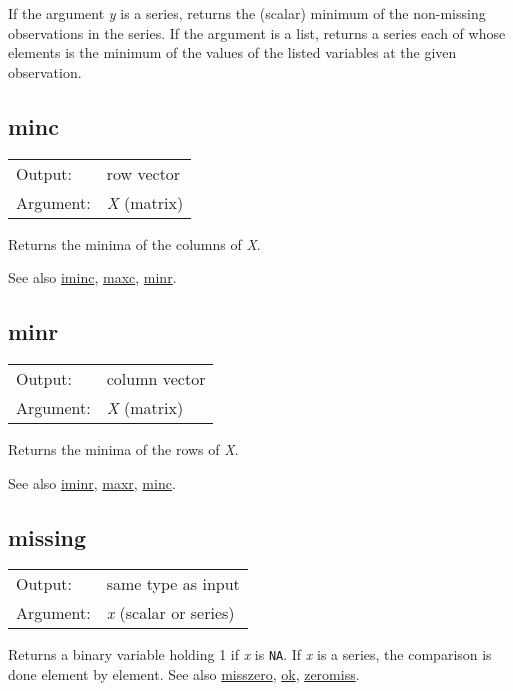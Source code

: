 	  If the argument \textsl{y} is a series, returns the
	  (scalar) minimum of the non-missing observations in the series.
	  If the argument is a list, returns a series each of whose
	  elements is the minimum of the values of the listed variables at
	  the given observation.

\subsection{minc}
\hypertarget{func-minc}{}

\begin{tabular}{ll}
Output:     & row vector\\
Argument:   & \textsl{X} (matrix)\\
\end{tabular}

	  Returns the minima of the columns of \textsl{X}.

	  See also \hyperlink{func-iminc}{iminc}, \hyperlink{func-maxc}{maxc}, \hyperlink{func-minr}{minr}.

\subsection{minr}
\hypertarget{func-minr}{}

\begin{tabular}{ll}
Output:     & column vector\\
Argument:   & \textsl{X} (matrix)\\
\end{tabular}

	  Returns the minima of the rows of \textsl{X}. 

	  See also \hyperlink{func-iminr}{iminr}, \hyperlink{func-maxr}{maxr}, \hyperlink{func-minc}{minc}.

\subsection{missing}
\hypertarget{func-missing}{}

\begin{tabular}{ll}
Output:     & same type as input\\
Argument:   & \textsl{x} (scalar or series)\\
\end{tabular}

	  Returns a binary variable holding 1 if \textsl{x} is
	  \texttt{NA}. If \textsl{x} is a series, the
	  comparison is done element by element. 
	  See also \hyperlink{func-misszero}{misszero}, \hyperlink{func-ok}{ok}, \hyperlink{func-zeromiss}{zeromiss}.

